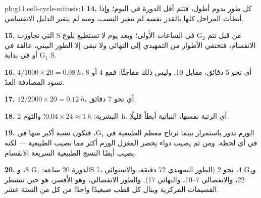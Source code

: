 \begin{solution}{pb:g11:cell-cycle-mitosis:1}
\textbf{14.} كل طور يدوم أطول، فتتم  أقل الدورة في اليوم؛ وإذا
أبطأت المراحل كلها بالقدر نفسه لم تتغير النسب، ومنه لم يتغير الدليل
الانقسامي.

\textbf{15.}  التي تجاوزت S من قبل تتم $\mathrm{G_2}$  في الساعات الأولى؛ وبعد يوم لا تستطيع  بلوغ الانقسام،
فتختفي الأطوار من التمهيدي إلى النهائي ولا تبقى إلا  الطور
البيني، عالقة في $\mathrm{G_1}$ أو في بداية S.

\textbf{16.} $4/1000 \times 20 = \qty{0.08}{h}$، أي نحو 5 دقائق،
مقابل 10. وليس ذلك مفاجئًا: فمع 4 أو 8  تسود المصادفة العدّ.

\textbf{17.} $12/2000 \times 20 = \qty{0.12}{h}$، أي نحو 7 دقائق.

\textbf{18.} البشرية: $0.04 \times 24 \approx \qty{1}{h}$؛ والثوم
\qty{2}{h}. أي الرتبة نفسها،  النباتية أبطأ قليلًا.

\textbf{19.}  الورم تدور باستمرار بينما ترتاح معظم 
الطبيعية في $\mathrm{G_1}$، فتكون نسبة أكبر منها في 
في أي لحظة. ومن ثم يصيب دواء يحصر المغزل  الورم أكثر مما يصيب
الطبيعية --- لكنه يصيب أيضًا النسج الطبيعية السريعة الانقسام.

\textbf{20.} الدورة 20 ساعة: $\mathrm{G_1}$ 8، وS 7، و$\mathrm{G_2}$
4،  نحو 2 (الطور التمهيدي 72 دقيقة، والاستوائي 22،
والانفصالي 7--10، والنهائي 17). والطور الانفصالي، وهو الأقصر، هو حين
تنشطر القسيمات المركزية وينال كل قطب صبغيدًا واحدًا من كل من 
الستة عشر.
\end{solution}
